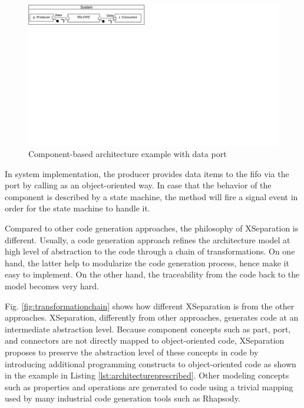 \begin{figure}
	\centering
	\includegraphics[clip, trim=0cm 16.3cm 17.6cm 0cm, width=\columnwidth]{figures/dataportexample.pdf}
	\caption{Component-based architecture example with data port} 
	\label{fig:dataportexample}
\end{figure}


\begin{minipage}{0.95\columnwidth}
	
\end{minipage} 

In system implementation, the producer provides data items to the fifo via the port  by calling  as an object-oriented way.
In case that the behavior of the component is described by a state machine, the  method will fire a signal event in order for the state machine to handle it.




\vskip 0.1cm
Compared to other code generation approaches, the philosophy of XSeparation is different.
Usually, a code generation approach refines the architecture model at high level of abstraction to the code through a chain of transformations.
On one hand, the latter help to modularize the code generation process, hence make it easy to implement.
On the other hand, the traceability from the code back to the model becomes very hard.

Fig. \ref{fig:transformationchain} shows how different XSeparation is from the other approaches.
XSeparation, differently from other approaches, generates code at an intermediate abstraction level.
Because component concepts such as part, port, and connectors are not directly mapped to object-oriented code, XSeparation proposes to preserve the abstraction level of these concepts in code by introducing additional programming constructs to object-oriented code as shown in the example in Listing \ref{lst:architectureprescribed}.
Other modeling concepts such as properties and operations are generated to code using a trivial mapping used by many industrial code generation tools such as Rhapsody.

